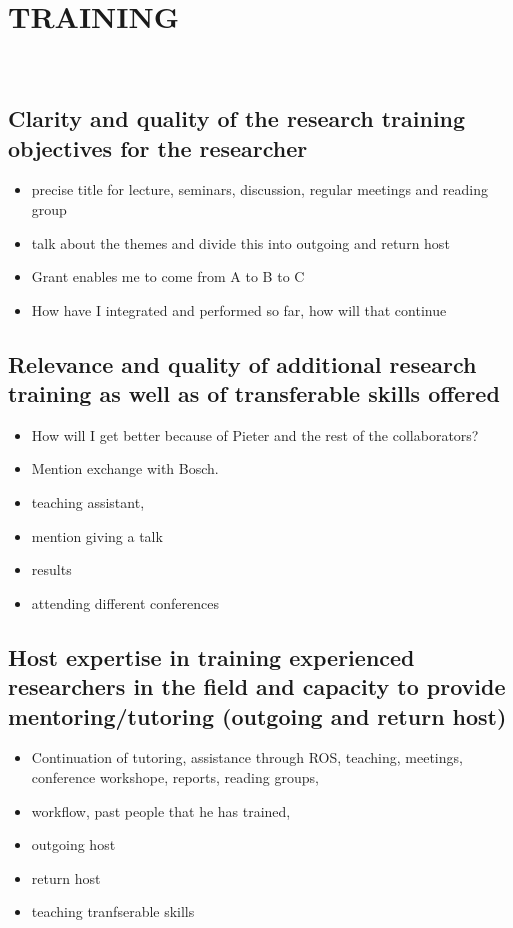 \section{TRAINING} %
\label{sec:training}
\\
\subsection{Clarity and quality of the research training objectives for the researcher}
\begin{itemize}
\item precise title for lecture, seminars, discussion, regular meetings and reading group
\item talk about the themes and divide this into outgoing and return host
\item Grant enables me to come from A to B to C
\item How have I integrated and performed so far, how will that continue
\end{itemize}
\subsection{Relevance and quality of additional research training as well as of transferable skills offered}
\begin{itemize}
\item How will I get better because of Pieter and the rest of the collaborators?
\item Mention exchange with Bosch.
\item teaching assistant, 
\item mention giving a talk
\item results
\item attending different conferences
\end{itemize}
\subsection{Host expertise in training  experienced researchers in the field and capacity to provide 
mentoring/tutoring (outgoing and return host)} 
\begin{itemize}
\item Continuation of tutoring, assistance through ROS, teaching, meetings, conference workshope, reports, reading groups, 
\item workflow, past people that he has trained, 
\item outgoing host
\item return host
\item teaching tranfserable skills
\end{itemize}
\newpage


